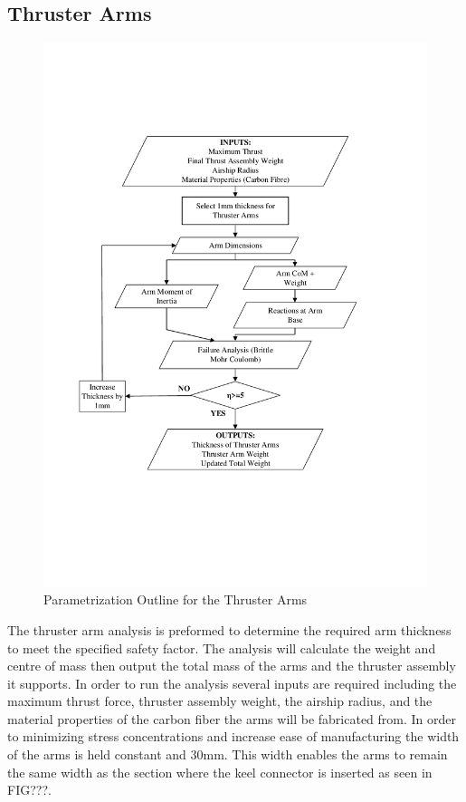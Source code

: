 \documentclass[../main.tex]{subfiles}
\begin{document}
\subsection{Thruster Arms} \label{thrustArms}

\begin{figure}[H]
	\centering
	\includegraphics[width=.9\linewidth]{img/paramaterization/thrusterArms.pdf}
	\caption{Parametrization Outline for the Thruster Arms}
	\label{fig:thrusterArmsParametrization}
\end{figure}

The thruster arm analysis is preformed to determine the required arm thickness to meet the specified safety factor. The analysis will calculate the weight and centre of mass then output the total mass of the arms and the thruster assembly it supports. In order to run the analysis several inputs are required including the maximum thrust force, thruster assembly weight, the airship radius, and the material properties of the carbon fiber the arms will be fabricated from. In order to minimizing stress concentrations and increase ease of manufacturing the width of the arms is held constant and 30mm. This width enables the arms to remain the same width as the section where the keel connector is inserted as seen in FIG???. \\
\end{document}
